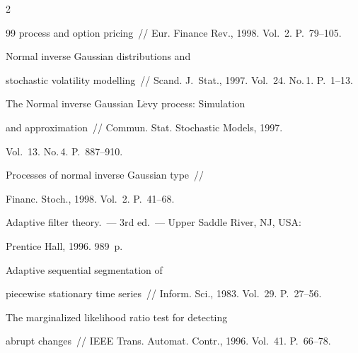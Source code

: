 \begin{multicols}{2}
{{\begin{thebibliography}{99}
process and option pricing~// Eur. Finance Rev., 1998. Vol.~2. P.~79--105.







  Normal inverse Gaussian distributions and 


stochastic volatility modelling~// Scand. J.~Stat., 1997. Vol.~24. No.\,1. P.~1--13.


    


   


    




 The Normal inverse Gaussian L$\acute{\mbox{e}}$vy process: Simulation 


and approximation~// Commun. Stat. Stochastic Models, 1997. 


Vol.~13. No.\,4. P.~887--910.







    Processes of normal inverse Gaussian type~// 


Financ. Stoch., 1998. Vol.~2. P.~41--68.







     Adaptive filter theory.~--- 3rd ed.~--- Upper Saddle River, NJ, USA: 


Prentice Hall, 1996. 989~p.







 Adaptive sequential segmentation of 


piecewise stationary time series~// Inform. Sci., 1983. Vol.~29. P.~27--56.







 The marginalized likelihood ratio test for detecting 


abrupt changes~// IEEE Trans. Automat. Contr., 1996. Vol.~41. P.~66--78.


    



\end{thebibliography}}}
\end{multicols}
